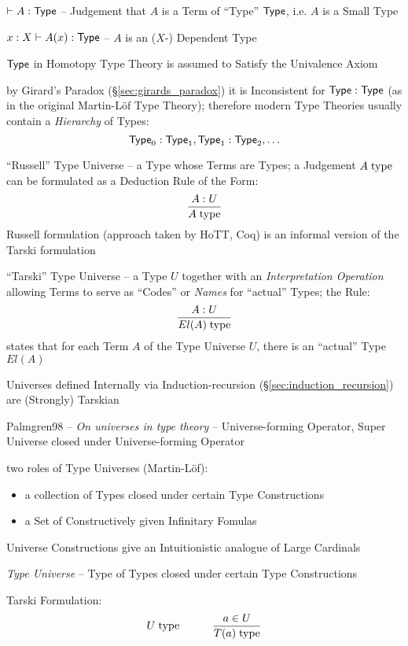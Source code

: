 $\vdash A:\mathsf{Type}$ -- Judgement that $A$ is a Term of ``Type'' $\mathsf{Type}$,
i.e. $A$ is a Small Type

$x:X \vdash A(x):\mathsf{Type}$ -- $A$ is an ($X$-) Dependent Type

$\mathsf{Type}$ in Homotopy Type Theory is assumed to Satisfy the Univalence
Axiom

by Girard's Paradox (\S\ref{sec:girards_paradox}) it is Inconsistent
for $\mathsf{Type} : \mathsf{Type}$ (as in the original Martin-L\"of Type Theory);
therefore modern Type Theories usually contain a \emph{Hierarchy} of
Types:
\[
  \mathsf{Type}_0 : \mathsf{Type}_1, \mathsf{Type}_1 : \mathsf{Type}_2, \ldots
\]

``Russell'' Type Universe -- a Type whose Terms are Types; a Judgement
$A \;\mathrm{type}$ can be formulated as a Deduction Rule of the Form:
\[
  \frac{A:U}{A \;\mathrm{type}}
\]
Russell formulation (approach taken by HoTT, Coq) is an informal
version of the Tarski formulation

``Tarski'' Type Universe -- a Type $U$ together with an
\emph{Interpretation Operation} allowing Terms to serve as ``Codes''
or \emph{Names} for ``actual'' Types; the Rule:
\[
  \frac{A:U}{El(A) \;\mathrm{type}}
\]
states that for each Term $A$ of the Type Universe $U$, there is an
``actual'' Type $El(A)$

Universes defined Internally via Induction-recursion
(\S\ref{sec:induction_recursion}) are (Strongly) Tarskian


\asterism

\begingroup %

\newcommand{\sett}{\;\mathrm{set}}


Palmgren98 -- \emph{On universes in type theory} -- Universe-forming
Operator, Super Universe closed under Universe-forming Operator

two roles of Type Universes (Martin-L\"of):
\begin{itemize}
  \item a collection of Types closed under certain Type Constructions
  \item a Set of Constructively given Infinitary Fomulas
\end{itemize}

Universe Constructions give an Intuitionistic analogue of Large
Cardinals

\emph{Type Universe} -- Type of Types closed under certain Type
Constructions

Tarski Formulation:
\[
  U \;\mathrm{type} \quad\quad\quad \frac{a \in U}{T(a) \;\mathrm{type}}
\]

